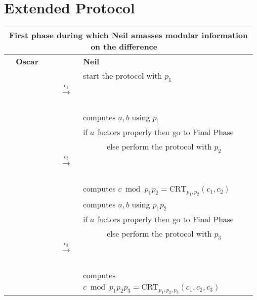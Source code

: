 \documentclass[11pt]{llncs}
\begin{document}
\appendix

\section{Extended Protocol}
\label{sec:extended}

\begin{center}
\begin{tabular}{lcl}\toprule
\multicolumn{3}{c}{{\sf First phase during which Neil amasses modular
information on the difference~~}} \\\midrule
~~{\bf Oscar}                      &                                                      &   {\bf Neil}~\\
                                   &                                                      &start the protocol with $p_1$~\\
                                   &~~{{\LARGE $\stackrel{c_1}{\longrightarrow}$}}~~      &   \\
                                   &                                                      &computes $a,b$ using $p_1$~\\
                                   &                                                      &if $a$ factors properly then go to {\sf Final Phase}\\
                                   &                                                      &~~~~~~else perform the protocol with $p_2$~~\\
                                   &~~{{\LARGE $\stackrel{c_2}{\longrightarrow}$}}~~      &   \\
                                   &                                                      &computes $c \bmod p_1 p_2=\mbox{CRT}_{p_1,p_2}(c_1,c_2)$~~\\
                                   &                                                      &computes $a,b$ using $p_1 p_2$~\\
                                   &                                                      &if $a$ factors properly then go to {\sf Final Phase}\\
                                   &                                                      &~~~~~~else perform the protocol with $p_3$~~\\
                                   &~~{{\LARGE $\stackrel{c_3}{\longrightarrow}$}}~~      &   \\
                                   &                                                      &computes $c \bmod p_1 p_2 p_3=\mbox{CRT}_{p_1,p_2,p_3}(c_1,c_2,c_3)$~~\\

\end{tabular}
\end{center}
\end{document}
